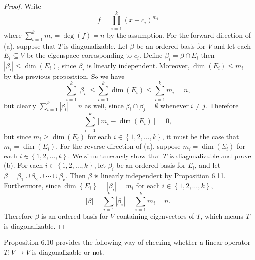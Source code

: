 \documentclass[linearalgebra]{subfiles}
\begin{document}
    \begin{proof}
        Write
        \begin{equation*}
            f = \prod^{k}_{i=1} \left( x-c_i \right) ^{m_i}
        \end{equation*}
        where $\sum^k_{i=1} m_i = \deg(f) = n$ by the assumption. For the forward direction of (a), suppose that $T$ is diagonalizable. Let $\beta$ be an ordered basis for $V$ and let each $E_i\subseteq V$ be the eigenspace corresponding to $c_i$. Define $\beta_i = \beta \cap E_i$ then $\left| \beta_i \right|\leq \dim \left( E_i \right)$, since $\beta_i$ is linearly independent. Moreover, $\dim \left( E_i \right)\leq m_i$ by the previous proposition. So we have
        \begin{equation*}
            \sum^k_{i=1} \left| \beta_i \right|\leq \sum^k_{i=1}\dim \left( E_i \right)\leq \sum^k_{i=1} m_i = n,
        \end{equation*}
        but clearly $\sum^k_{i=1} \left| \beta_i \right| = n$ as well, since $\beta_i\cap\beta_j = \emptyset$ whenever $i\neq j$. Therefore
        \begin{equation*}
            \sum^k_{i=1} \left[ m_i-\dim \left( E_i \right) \right] = 0,
        \end{equation*}
        but since $m_i\geq \dim \left( E_i \right)$ for each $i\in \left\lbrace 1, 2, \ldots, k \right\rbrace$, it must be the case that $m_i = \dim \left( E_i \right)$. For the reverse direction of (a), suppose $m_i = \dim \left( E_i \right)$ for each $i\in \left\lbrace 1, 2, \ldots, k \right\rbrace$. We simultaneously show that $T$ is diagonalizable and prove (b). For each $i\in \left\lbrace 1, 2, \ldots, k \right\rbrace$, let $\beta_i$ be an ordered basis for
        $E_i$, and let $\beta = \beta_1\cup\beta_2\cup\cdots\cup\beta_k$. Then $\beta$ is linearly independent by Proposition 6.11. Furthermore, since $\dim \left\lbrace E_i \right\rbrace = \left| \beta_i \right| = m_i$ for each $i\in \left\lbrace 1, 2, \ldots, k \right\rbrace$,
        \begin{equation*}
            \left| \beta \right| = \sum^k_{i=1} \left| \beta_i \right| = \sum^k_{i=1} m_i = n.
        \end{equation*}
        Therefore $\beta$ is an ordered basis for $V$ containing eigenvectors of $T$, which means $T$ is diagonalizable.
    \end{proof}

    \begin{remark}
        Proposition 6.10 provides the following way of checking whether a linear operator $T:V\to V$ is diagonalizable or not.
    \end{remark}
\end{document}
